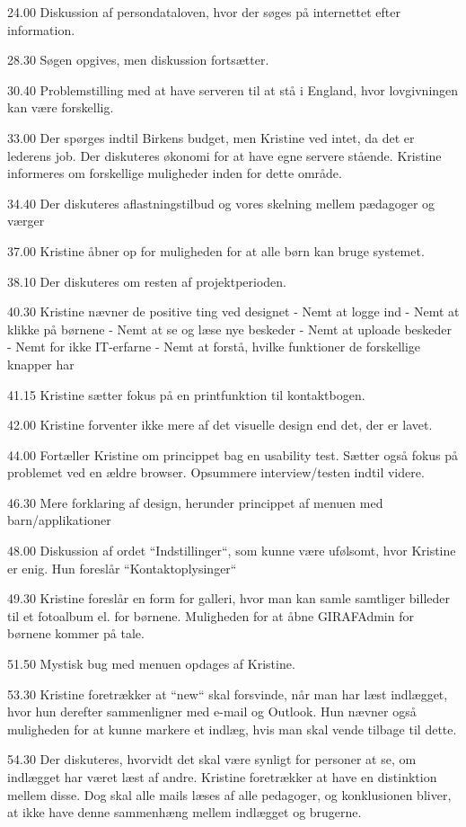 24.00
Diskussion af persondataloven, hvor der søges på internettet efter information.

28.30 
Søgen opgives, men diskussion fortsætter.

30.40
Problemstilling med at have serveren til at stå i England, hvor lovgivningen kan være forskellig.

33.00
Der spørges indtil Birkens budget, men Kristine ved intet, da det er lederens job. Der diskuteres økonomi for at have egne servere stående. 
Kristine informeres om forskellige muligheder inden for dette område.

34.40
Der diskuteres aflastningstilbud og vores skelning mellem pædagoger og værger

37.00
Kristine åbner op for muligheden for at alle børn kan bruge systemet.

38.10
Der diskuteres om resten af projektperioden.

40.30
Kristine nævner de positive ting ved designet
 - Nemt at logge ind
 - Nemt at klikke på børnene
 - Nemt at se og læse nye beskeder
 - Nemt at uploade beskeder
 - Nemt for ikke IT-erfarne
 - Nemt at forstå, hvilke funktioner de forskellige knapper har
 
41.15
Kristine sætter fokus på en printfunktion til kontaktbogen. 

42.00
Kristine forventer ikke mere af det visuelle design end det, der er lavet.

44.00
Fortæller Kristine om princippet bag en usability test. Sætter også fokus på problemet ved en ældre browser.
Opsummere interview/testen indtil videre.

46.30
Mere forklaring af design, herunder princippet af menuen med barn/applikationer

48.00
Diskussion af ordet ``Indstillinger``, som kunne være ufølsomt, hvor Kristine er enig. Hun foreslår ``Kontaktoplysinger``

49.30
Kristine foreslår en form for galleri, hvor man kan samle samtliger billeder til et fotoalbum el. for børnene. Muligheden for at åbne GIRAFAdmin for børnene kommer på tale.

51.50
Mystisk bug med menuen opdages af Kristine.

53.30
Kristine foretrækker at ``new`` skal forsvinde, når man har læst indlægget, hvor hun derefter sammenligner med e-mail og Outlook. Hun nævner også muligheden for at kunne markere et indlæg, hvis man skal vende tilbage til dette. 

54.30
Der diskuteres, hvorvidt det skal være synligt for personer at se, om indlægget har været læst af andre. Kristine foretrækker at have en distinktion mellem disse. Dog skal alle mails læses af alle pedagoger, og konklusionen bliver, at ikke have denne sammenhæng mellem indlægget og brugerne.

